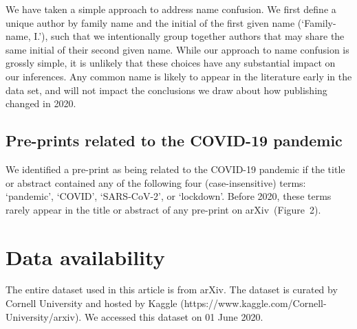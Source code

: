 \documentclass[a4paper,12pt]{article}
\newcommand{\todo}[1]{\textcolor{red}{#1}}
\newcommand{\arxiv}{arXiv}
\begin{document}
We have taken a simple approach to address name confusion. We first define a unique author by family name and the initial of the first given name (`Family-name, I.'), such that we intentionally group together authors that may share the same initial of their second given name. While our approach to name confusion is grossly simple, it is unlikely that these choices have any substantial impact on our inferences. Any common name is likely to appear in the literature early in the data set, and will not impact the conclusions we draw about how publishing changed in 2020. 

\subsection*{Pre-prints related to the COVID-19 pandemic}

We identified a pre-print as being related to the COVID-19 pandemic if the title or abstract contained any of the following four (case-insensitive) terms: `pandemic', `COVID', `SARS-CoV-2', or `lockdown'. Before 2020, these terms rarely appear in the title or abstract of any pre-print on \arxiv\ (Figure~2).


\section*{Data availability}

The entire dataset used in this article is from \arxiv. The dataset is curated by Cornell University and hosted by Kaggle (https://www.kaggle.com/Cornell-University/arxiv). We accessed this dataset on 01 June 2020.

\end{document}
